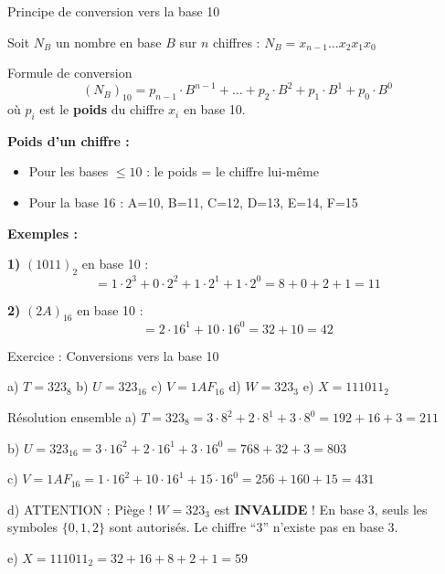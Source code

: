 \documentclass[aspectratio=1610]{beamer}
\begin{document}
\begin{frame}{Principe de conversion vers la base 10}

  Soit $N_B$ un nombre en base $B$ sur $n$ chiffres : $N_B = x_{n-1}\ldots x_2 x_1 x_0$

  \begin{block}{Formule de conversion}
    \[
      (N_B)_{10} = p_{n-1} \cdot B^{n-1} + \ldots + p_2 \cdot B^2 + p_1 \cdot B^1 + p_0 \cdot B^0
    \]
    où $p_i$ est le \textbf{poids} du chiffre $x_i$ en base 10.
  \end{block}

  \vspace{0.5em}

  \textbf{Poids d'un chiffre :}
  \begin{itemize}
    \item Pour les bases $\leq 10$ : le poids = le chiffre lui-même
    \item Pour la base 16 : A=10, B=11, C=12, D=13, E=14, F=15
  \end{itemize}

  \vspace{0.5em}

  \pause
  \textbf{Exemples :}

  \textbf{1)} $(1011)_2$ en base 10 :
  \[
    = 1 \cdot 2^3 + 0 \cdot 2^2 + 1 \cdot 2^1 + 1 \cdot 2^0 = 8 + 0 + 2 + 1 = 11
  \]

  \textbf{2)} $(2A)_{16}$ en base 10 :
  \[
    = 2 \cdot 16^1 + 10 \cdot 16^0 = 32 + 10 = 42
  \]

\end{frame}

\begin{frame}{Exercice : Conversions vers la base 10}


      a) $T = 323_8$
      b) $U = 323_{16}$
      c) $V = 1AF_{16}$
      d) $W = 323_3$
      e) $X = 111011_2$

  \vspace{1em}

  \pause
  \begin{block}{Résolution ensemble}
    a) $T = 323_8 = 3 \cdot 8^2 + 2 \cdot 8^1 + 3 \cdot 8^0 = 192 + 16 + 3 = 211$

    b) $U = 323_{16} = 3 \cdot 16^2 + 2 \cdot 16^1 + 3 \cdot 16^0 = 768 + 32 + 3 = 803$

    c) $V = 1AF_{16} = 1 \cdot 16^2 + 10 \cdot 16^1 + 15 \cdot 16^0 = 256 + 160 + 15 = 431$
  \end{block}

  \pause
  \begin{alertblock}{d) ATTENTION : Piège !}
    $W = 323_3$ est \textbf{INVALIDE} ! En base 3, seuls les symboles $\{0, 1, 2\}$ sont autorisés. Le chiffre ``3'' n'existe pas en base 3.

  \end{alertblock}

  e) $X = 111011_2 = 32 + 16 + 8 + 2 + 1 = 59$

\end{frame}
\end{document}
